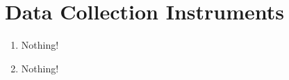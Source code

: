 \section{Data Collection Instruments}
\label{paperB:instrument}
\begin{enumerate}
 \item Nothing!
 \item Nothing!
\end{enumerate}